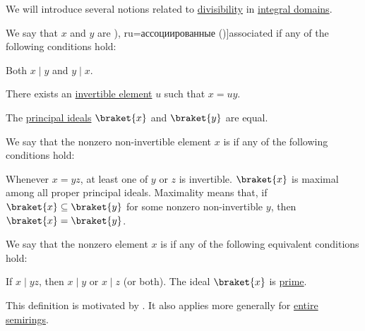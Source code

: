 \begin{definition}\label{def:domain_divisibility}
  We will introduce several notions related to \hyperref[def:divisibility]{divisibility} in \hyperref[def:integral_domain]{integral domains}.

  \begin{thmenum}
     We say that \( x \) and \( y \) are \term[bg=асоциирани (\cite[142]{ГеновИПр1991Алгебра}), ru=ассоциированные (\cite[118]{Винберг2014Алгебра})]{associated} if any of the following conditions hold:
    \begin{thmenum}
       Both \( x \mid y \) and \( y \mid x \).

       There exists an \hyperref[def:divisibility/invertible]{invertible element} \( u \) such that \( x = uy \).

       The \hyperref[def:semiring_ideal/principal]{principal ideals} \( \braket{ x } \) and \( \braket{ y } \) are equal.
    \end{thmenum}

     We say that the nonzero non-invertible element \( x \) is  if any of the following conditions hold:
    \begin{thmenum}
       Whenever \( x = yz \), at least one of \( y \) or \( z \) is invertible.
       \( \braket{ x } \) is maximal among all proper principal ideals. Maximality means that, if \( \braket{ x } \subseteq \braket{ y } \) for some nonzero non-invertible \( y \), then \( \braket{ x } = \braket{ y } \).
    \end{thmenum}

     We say that the nonzero element \( x \) is  if any of the following equivalent conditions hold:
    \begin{thmenum}
       If \( x \mid yz \), then \( x \mid y \) or \( x \mid z \) (or both).
       The ideal \( \braket{ x } \) is \hyperref[def:semiring_ideal/prime]{prime}.
    \end{thmenum}

    This definition is motivated by . It also applies more generally for \hyperref[def:entire_semiring]{entire semirings}.
  \end{thmenum}
\end{definition}
